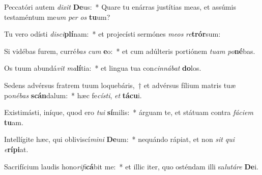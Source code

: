 \item Peccatóri autem \textit{di}\textit{xit} \textbf{De}us:~* Quare tu enárras justítias meas, et assúmis testaméntum me\textit{um} \textit{per} \textit{os} \textbf{tu}um?
\item Tu vero odísti \textit{di}\textit{sci}\textbf{plí}nam:~* et projecísti sermónes \textit{me}\textit{os} \textit{re}\textbf{trór}sum:
\item Si vidébas furem, curré\textit{bas} \textit{cum} \textbf{e}o:~* et cum adúlteris portiónem \textit{tu}\textit{am} \textit{po}\textbf{né}bas.
\item Os tuum abundá\textit{vit} \textit{ma}\textbf{lí}tia:~* et lingua tua con\textit{cin}\textit{ná}\textit{bat} \textbf{do}los.
\item Sedens advérsus fratrem tuum loquebáris,~† et advérsus fílium matris tuæ po\textit{né}\textit{bas} \textbf{scán}dalum:~* hæc fe\textit{cís}\textit{ti}, \textit{et} \textbf{tá}\textbf{cu}i.
\item Existimásti, iníque, quod ero \textit{tu}\textit{i} \textbf{sí}milis:~* árguam te, et státuam contra \textit{fá}\textit{ci}\textit{em} \textbf{tu}am.
\item Intellígite hæc, qui obliviscí\textit{mi}\textit{ni} \textbf{De}um:~* nequándo rápiat, et non \textit{sit} \textit{qui} \textit{e}\textbf{rí}\textbf{pi}at.
\item Sacrifícium laudis hono\textit{ri}\textit{fi}\textbf{cá}bit me:~* et illic iter, quo osténdam illi sa\textit{lu}\textit{tá}\textit{re} \textbf{De}i.
